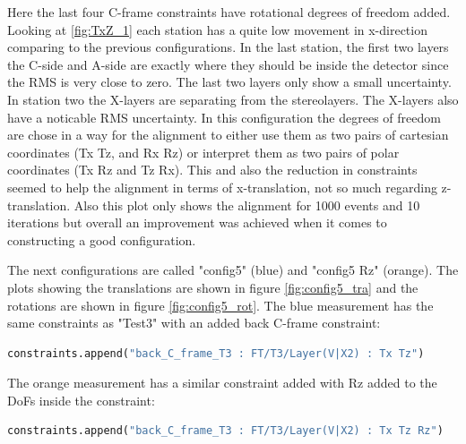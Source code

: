 Here the last four C-frame constraints have rotational degrees of freedom added.
Looking at \ref{fig:TxZ_1} each station has a quite low movement in x-direction comparing to the previous configurations. In the last station, the first two layers the C-side and A-side are exactly where they should be inside the detector since the RMS is very close to zero. The last two layers only show a small uncertainty. In station
two the X-layers are separating from the stereolayers. The X-layers also have a noticable RMS uncertainty. In this configuration the degrees of freedom are chose in a way for the alignment to either use them as two pairs of cartesian coordinates (Tx Tz, and Rx Rz) or interpret them as two pairs of polar coordinates (Tx Rz and Tz Rx).
This and also the reduction in constraints seemed to help the alignment in terms of x-translation, not so much regarding z-translation. Also this plot only shows the alignment for 1000 events and 10 iterations but overall an improvement was achieved
when it comes to constructing a good configuration.

The next configurations are called "config5" (blue) and "config5 Rz" (orange). The plots showing the translations are shown in figure \ref{fig:config5_tra} and the rotations are shown in figure \ref{fig:config5_rot}.
The blue measurement has the same constraints as "Test3" with an added back C-frame constraint:
\begin{lstlisting}[language=Python]
  constraints.append("back_C_frame_T3 : FT/T3/Layer(V|X2) : Tx Tz")
\end{lstlisting}

The orange measurement has a similar constraint added with Rz added to the DoFs inside the constraint:
\begin{lstlisting}[language=Python]
  constraints.append("back_C_frame_T3 : FT/T3/Layer(V|X2) : Tx Tz Rz")
\end{lstlisting}

